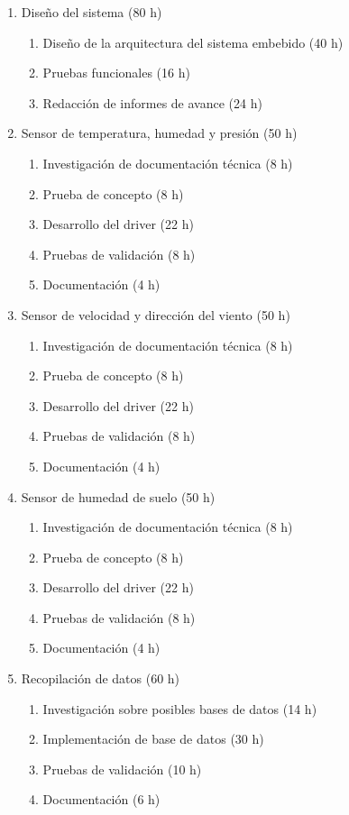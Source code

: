 \documentclass[
11pt, %
codirector, %
]{charter}
\begin{document}
\begin{enumerate}

\item Diseño del sistema (80 h)
	\begin{enumerate}
	\item Diseño de la arquitectura del sistema embebido (40 h)
	\item Pruebas funcionales (16 h)
	\item Redacción de informes de avance (24 h)
	\end{enumerate}

\item Sensor de temperatura, humedad y presión (50 h)
	\begin{enumerate}
	\item Investigación de documentación técnica (8 h)
	\item Prueba de concepto (8 h)
	\item Desarrollo del driver (22 h)
	\item Pruebas de validación (8 h)
	\item Documentación (4 h)
	\end{enumerate}
	
\item Sensor de velocidad y dirección del viento (50 h)
	\begin{enumerate}
	\item Investigación de documentación técnica (8 h)
	\item Prueba de concepto (8 h)
	\item Desarrollo del driver (22 h)
	\item Pruebas de validación (8 h)
	\item Documentación (4 h)
	\end{enumerate}
	
\item Sensor de humedad de suelo (50 h)
	\begin{enumerate}
	\item Investigación de documentación técnica (8 h)
	\item Prueba de concepto (8 h)
	\item Desarrollo del driver (22 h)
	\item Pruebas de validación (8 h)
	\item Documentación (4 h)
	\end{enumerate}
\newpage
\item Recopilación de datos (60 h)
	\begin{enumerate}
	\item Investigación sobre posibles bases de datos (14 h)
	\item Implementación de base de datos (30 h)
	\item Pruebas de validación (10 h)
	\item Documentación (6 h)
	\end{enumerate}


\end{enumerate}
\end{document}
